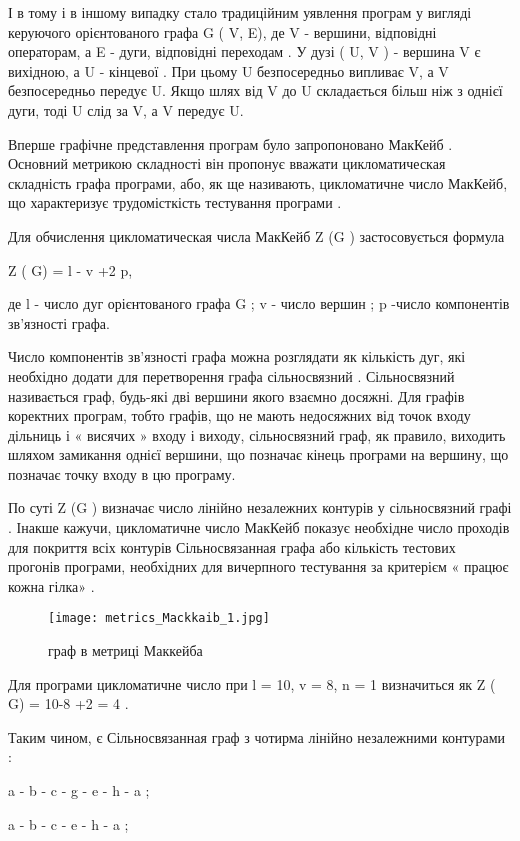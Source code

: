 І в тому і в іншому випадку стало традиційним уявлення програм у вигляді керуючого орієнтованого графа G ( V, E), де V - вершини, відповідні операторам, а E - дуги, відповідні переходам . У дузі ( U, V ) - вершина V є вихідною, а U - кінцевої . При цьому U безпосередньо випливає V, а V безпосередньо передує U. Якщо шлях від V до U складається більш ніж з однієї дуги, тоді U слід за V, а V передує U.

Вперше графічне представлення програм було запропоновано МакКейб . Основний метрикою складності він пропонує вважати цикломатическая складність графа програми, або, як ще називають, цикломатичне число МакКейб, що характеризує трудомісткість тестування програми .

Для обчислення цикломатическая числа МакКейб Z (G ) застосовується формула

Z ( G) = l - v +2 p,

де l - число дуг орієнтованого графа G ; v - число вершин ; p -число компонентів зв'язності графа.

Число компонентів зв'язності графа можна розглядати як кількість дуг, які необхідно додати для перетворення графа сільносвязний . Сільносвязний називається граф, будь-які дві вершини якого взаємно досяжні. Для графів коректних програм, тобто графів, що не мають недосяжних від точок входу дільниць і « висячих » входу і виходу, сільносвязний граф, як правило, виходить шляхом замикання однієї вершини, що позначає кінець програми на вершину, що позначає точку входу в цю програму.

По суті Z (G ) визначає число лінійно незалежних контурів у сільносвязний графі . Інакше кажучи, цикломатичне число МакКейб показує необхідне число проходів для покриття всіх контурів Сільносвязанная графа або кількість тестових прогонів програми, необхідних для вичерпного тестування за критерієм « працює кожна гілка» .

\begin{figure}[h]
    \centering
    \texttt{[image: metrics\_Mackkaib\_1.jpg]}
    \caption{граф в метриці Маккейба}
    \label{fig:awesome_image}
\end{figure}

Для програми цикломатичне число при l = 10, v = 8, n = 1 визначиться як Z ( G) = 10-8 +2 = 4 .

Таким чином, є Сільносвязанная граф з чотирма лінійно незалежними контурами :

a - b - c - g - e - h - a ;

a - b - c - e - h - a ;


